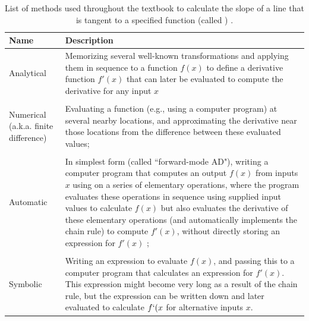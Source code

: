 \begin{table}
  \caption[Methods used for differentiation]{List of methods used throughout the textbook to calculate the slope of a line that is tangent to a specified function (called ) \cite{baydin_automatic_2018}.}
\begin{center}
\begin{tabularx}{\textwidth}{ | X m{4in} | } 
  \hline
  Name & Description \\ 
  \hline

  Analytical & Memorizing several well-known transformations and applying them in sequence to a function \( f(x) \) to define a derivative function \( f'(x) \) that can later be evaluated to compute the derivative for any input \(x\) \\ & \\ 

  Numerical \newline(a.k.a. finite difference) & Evaluating a function (e.g., using a computer program) at several nearby locations, and approximating the derivative near those locations from the difference between these evaluated values; \\ & \\ 
  
  Automatic & In simplest form (called ``forward-mode AD"), writing a computer program that computes an output \( f(x) \) from inputs \(x\) using on a series of elementary operations, where the program evaluates these operations in sequence using supplied input values to calculate \(f(x)\) but also evaluates the derivative of these elementary operations (and automatically implements the chain rule) to compute \(f'(x)\), without directly storing an expression for \(f'(x)\) \cite{griewank_evaluating_2008,wengert_simple_1964}; \\ & \\

  Symbolic & Writing an expression to evaluate \( f(x) \), and passing this to a computer program that calculates an expression for \( f'(x) \). This expression might become very long as a result of the chain rule, but the expression can be written down and later evaluated to calculate \(f`(x\) for alternative inputs \(x\). \\
  
  \hline
\end{tabularx}
  \label{tab:Chap1_differentiation}
\end{center}
\end{table}


